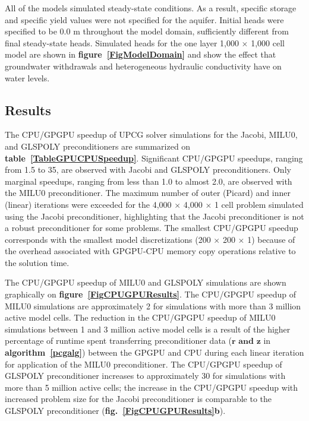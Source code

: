 \documentclass[12pt]{article}
\begin{document}
All of the models simulated steady-state conditions. As a result, specific storage and specific yield values were not specified for the aquifer. Initial heads were specified to be 0.0 m throughout the model domain, sufficiently different from final steady-state heads. Simulated heads for the one layer 1,000 $\times$ 1,000 cell model are shown in \textbf{figure~\ref{FigModelDomain}} and show the effect that groundwater withdrawals and heterogeneous hydraulic conductivity have on water levels.


\subsection*{Results}
The CPU/GPGPU speedup of UPCG solver simulations for the Jacobi, MILU0, and GLSPOLY preconditioners are summarized on \textbf{table~\ref{TableGPUCPUSpeedup}}. Significant  CPU/GPGPU speedups, ranging from 1.5 to 35, are observed with Jacobi and GLSPOLY preconditioners. Only marginal speedups, ranging from less than 1.0 to almost 2.0, are observed with the MILU0 preconditioner. The maximum number of outer (Picard) and inner (linear) iterations were exceeded for the 4,000 $\times$ 4,000 $\times$ 1 cell problem simulated using the Jacobi preconditioner, highlighting that the Jacobi preconditioner is not a robust preconditioner for some problems. The smallest CPU/GPGPU speedup corresponds with the smallest model discretizations (200 $\times$ 200 $\times$ 1) because of the overhead associated with GPGPU-CPU memory copy operations relative to the solution time. 
 
The CPU/GPGPU speedup of MILU0 and GLSPOLY simulations are shown graphically on \textbf{figure~\ref{FigCPUGPUResults}}. The CPU/GPGPU speedup of MILU0 simulations are approximately 2 for simulations with more than 3 million active model cells. The reduction in the CPU/GPGPU speedup of MILU0 simulations between 1 and 3 million active model cells is a result of the higher percentage of runtime spent transferring preconditioner data ($\mathbf{r \text{ and } z}$ in \textbf{algorithm~\ref{pcgalg}}) between the GPGPU and CPU during each linear iteration for application of the MILU0 preconditioner. The CPU/GPGPU speedup of  GLSPOLY preconditioner increases to approximately 30 for simulations with more than 5 million active cells; the increase in the CPU/GPGPU speedup with increased problem size for the Jacobi preconditioner is comparable to the GLSPOLY preconditioner (\textbf{fig.~\ref{FigCPUGPUResults}b}).
\end{document}

